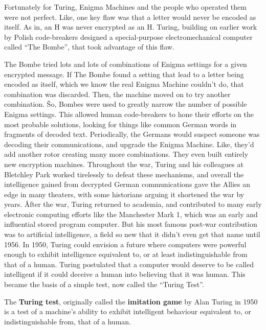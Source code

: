 Fortunately for Turing, Enigma Machines and the people who operated them were not perfect. Like, one key flaw was
that a letter would never be encoded as itself. As in, an H was never encrypted as an H. Turing, building on earlier
work by Polish code-breakers designed a special-purpose electromechanical computer called ``The Bombe'', that took
advantage of this flaw.


The Bombe tried lots and lots of combinations of Enigma settings for a given encrypted message. If The Bombe found a
setting that lead to a letter being encoded as itself, which we know the real Enigma Machine couldn't do, that
combination was discarded. Then, the machine moved on to try another combination. \v

So, Bombes were used to greatly narrow the number of possible Enigma settings. This allowed human code-breakers to
hone their efforts on the most probable solutions, looking for things like common German words in fragments of
decoded text. Periodically, the Germans would suspect someone was decoding their communications, and upgrade the
Enigma Machine. Like, they'd add another rotor creating many more combinations. They even built entirely new
encryption machines. Throughout the war, Turing and his colleagues at Bletchley Park worked tirelessly to defeat
these mechanisms, and overall the intelligence gained from decrypted German communications gave the Allies an edge in
many theaters, with some historians arguing it shortened the war by years. \v

After the war, Turing returned to academia, and contributed to many early electronic computing efforts like the
Manchester Mark 1, which was an early and influential stored program computer. But his most famous post-war
contribution was to artificial intelligence, a field so new that it didn't even get that name until 1956. In 1950,
Turing could envision a future where computers were powerful enough to exhibit intelligence equivalent to, or at
least indistinguishable from that of a human. Turing postulated that a computer would deserve to be called
intelligent if it could deceive a human into believing that it was human. This became the basis of a simple test, now
called the ``Turing Test''.

The \textbf{Turing test}, originally called the \textbf{imitation game} by Alan Turing in 1950 is a test of a
machine's ability to exhibit intelligent behaviour equivalent to, or indistinguishable from, that of a human.
\ed

